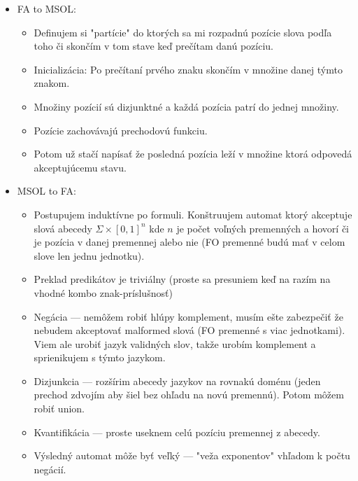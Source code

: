 \documentclass[paper=a4, fontsize=11pt]{scrartcl} %
\numberwithin{equation}{section} %
\numberwithin{figure}{section} %
\numberwithin{table}{section} %
\begin{document}
\begin{itemize}
	\item FA to MSOL:
	
	\begin{itemize}
		\item Definujem si "partície" do ktorých sa mi rozpadnú pozície slova podľa toho či skončím v tom stave keď prečítam danú pozíciu.

		\item Inicializácia: Po prečítaní prvého znaku skončím v množine danej týmto znakom.
		\item Množiny pozícií sú dizjunktné a každá pozícia patrí do jednej množiny.
		\item Pozície zachovávajú prechodovú funkciu.
	
		\item Potom už stačí napísať že posledná pozícia leží v množine ktorá odpovedá akceptujúcemu stavu.
	\end{itemize}

	\item MSOL to FA:
	
	\begin{itemize}
		\item Postupujem induktívne po formuli. Konštruujem automat ktorý akceptuje slová abecedy $\Sigma \times [0,1]^n$ kde $n$ je počet voľných premenných a hovorí či je pozícia v danej premennej alebo nie (FO premenné budú mať v celom slove len jednu jednotku).
		
		\item Preklad predikátov je triviálny (proste sa presuniem keď na razím na vhodné kombo znak-príslušnosť)
		
		\item Negácia — nemôžem robiť hlúpy komplement, musím ešte zabezpečiť že nebudem akceptovať malformed slová (FO premenné s viac jednotkami). Viem ale urobiť jazyk validných slov, takže urobím komplement a sprienikujem s týmto jazykom.
		
		\item Dizjunkcia — rozšírim abecedy jazykov na rovnakú doménu (jeden prechod zdvojím aby šiel bez ohľadu na novú premennú). Potom môžem robiť union.
		
		\item Kvantifikácia — proste useknem celú pozíciu premennej z abecedy.
		
		\item Výsledný automat môže byť veľký — "veža exponentov" vhľadom k počtu negácií.		
	\end{itemize}


\end{itemize}
\end{document}
